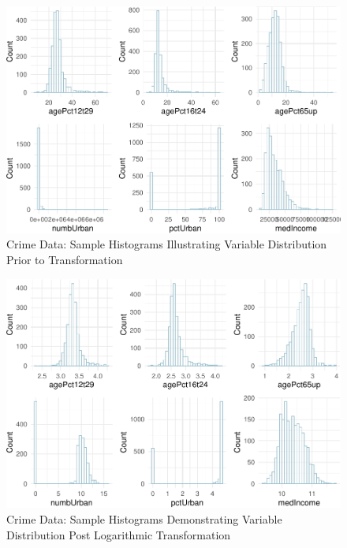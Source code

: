 \documentclass[
  11pt,
]{article}
\begin{document}
\begin{figure}[H]

{\centering \includegraphics[width=0.85\linewidth]{dissertation_files/figure-latex/Histograms df Plot-1} 

}

\caption{Crime Data: Sample Histograms Illustrating Variable Distribution Prior to Transformation}\label{fig:Histograms df Plot}
\end{figure}

\begin{figure}[H]

{\centering \includegraphics[width=0.85\linewidth]{dissertation_files/figure-latex/Histograms df_t Plot-1} 

}

\caption{Crime Data: Sample Histograms Demonstrating Variable Distribution Post Logarithmic Transformation}\label{fig:Histograms df_t Plot}
\end{figure}
\end{document}
